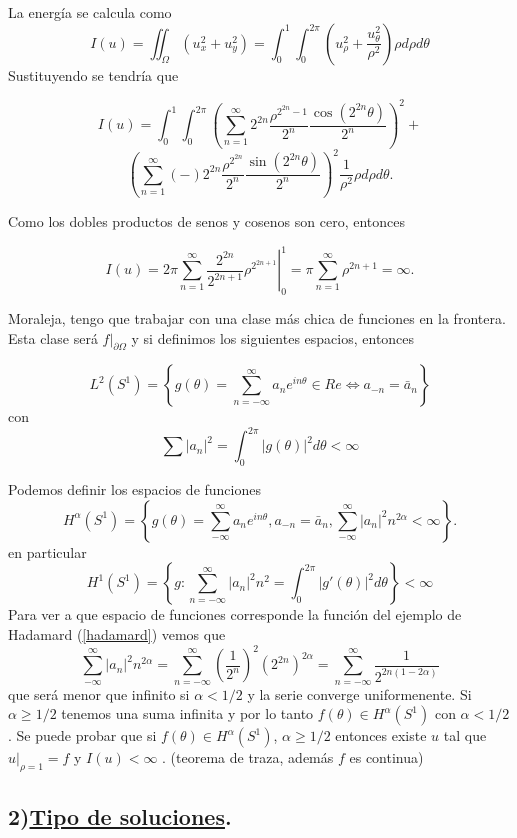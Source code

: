 \documentclass[a4paper,10pt]{book}
\begin{document}
La energ\'ia se calcula como
\[ I(u)= \iint_{\Omega} (u_x^2+u_y^2)= \int_0^1 \int_0^{2\pi} \left( u_{\rho} ^{2} + \frac{u_\theta ^2 }{\rho^2} \right) \rho d\rho d\theta
\]
Sustituyendo se tendr\'ia que

\[ I(u)= \int_0^1 \int_0^{2\pi} \left( 
 \sum\limits_{n=1}^{\infty}  2^{2n} \frac{\rho ^{2 ^{2n}-1 } }{2^n} \frac{\cos(2^{2n} \theta)}{2^n} \right)^2+
\]
\[
 \left( 
 \sum\limits_{n=1}^{\infty} (-) 2^{2n} \frac{\rho ^{2 ^{2n} } }{2^n} \frac{\sin(2^{2n} \theta)}{2^n} \right)^2 \frac{1}{\rho^2} \rho 
d\rho d\theta.
\]

Como los dobles productos de senos y cosenos son cero, entonces

\[I(u)=\left.2\pi \sum\limits_{n=1}^{\infty} \frac{2^{2n}}{2^{2n+1} } \rho^{2^{2n+1}}\right|_0^1=\pi \sum\limits_{n=1}^{\infty} \rho^{2n+1}=\infty.\]

Moraleja, tengo que trabajar con una clase m\'as chica de funciones en la frontera. Esta clase ser\'a $f|_{\partial \Omega}$ y
si definimos los siguientes espacios, entonces

\[ L^2 (S^1)=\left\lbrace g(\theta)=\sum\limits_{n=-\infty}^{\infty} a_n e^{i n \theta } \in Re \Leftrightarrow
 a_{-n}=\bar{a}_n \right\rbrace
\]
con 
\[\sum\limits |a_n|^2 =\int_{0}^{2\pi} |g(\theta)|^2 d\theta < \infty \]

Podemos definir los espacios de funciones
\[H^{\alpha}(S^1)=\left\lbrace  g(\theta) = \sum\limits_{-\infty}^{\infty} a_n e^{in\theta}, a_{-n}=\bar{a}_n, \sum\limits_{-\infty}^{\infty} |a_n|^2 n^{2\alpha} <\infty  \right\rbrace.
\]
en particular
\[H^1(S^1)=\left\lbrace g: \sum\limits_{n=-\infty}^{\infty} | a_n|^2 n^2 =\int_0^{2\pi} |g'(\theta)|^2 d\theta \right\rbrace < \infty \] 
Para ver a que espacio de funciones corresponde la funci\'on  del ejemplo de Hadamard (\ref{hadamard}) vemos que
\[\sum\limits_{-\infty}^{\infty} |a_n|^2 n^{2\alpha} =\sum\limits_{n=-\infty}^{\infty} \left(\frac{1}{2^n} \right)^2 (2^{2n} )^{2\alpha} =\sum\limits_{n=-\infty}^{\infty} \frac{1}{2^{2n(1-2\alpha)}} \] 
que ser\'a menor que infinito si $\alpha <1/2$  y la serie converge uniformenente. Si $\alpha\geq 1/2$ tenemos una
suma infinita y por lo tanto $f(\theta)\in H^{\alpha}(S^{1} )$ con $\alpha<1/2$ .
Se puede probar que si $f(\theta)\in H^{\alpha}(S^1)$, $\alpha\geq 1/2$ entonces existe
$u$ tal que $u|_{\rho =1}=f$ y $I(u)<\infty$ . (teorema de traza, adem\'as $f$ es continua)

\subsection*{2)\underline{Tipo de soluciones}.}
\end{document}
